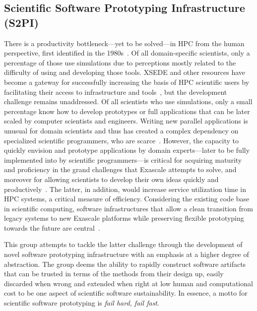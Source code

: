 \subsection{Scientific Software Prototyping Infrastructure (S2PI)}
\label{sec:prototyping}

There is a productivity bottleneck---yet to be solved---in HPC from the human
perspective, first identified in the 1980s~\cite{barstow1982automatic}. Of all
domain-specific scientists, only a percentage of those use simulations due to
perceptions mostly related to the difficulty of using and developing those tools.
XSEDE and other resources have become a gateway for successfully increasing the
basis of HPC scientific users by facilitating their access to infrastructure and
tools~\cite{towns2014xsede}, but the development challenge remains unaddressed.
Of all scientists who use simulations, only a small percentage know how
to develop prototypes or full applications that can be later scaled by computer
scientists and engineers. Writing new parallel applications is unusual for
domain scientists and thus has created a complex dependency on specialized
scientific programmers, who are scarce~\cite{post2005computational}. However,
the capacity to quickly envision and prototype applications by domain
experts---later to be fully implemented into by scientific programmers---is critical for
acquiring maturity and proficiency in the grand challenges that Exascale
attempts to solve, and moreover for allowing scientists to develop their own
ideas quickly and productively~\cite{vinter2015prototyping}. The latter, in
addition, would increase service utilization time in HPC systems, a critical
measure of efficiency. Considering the existing code base in scientific
computing, software infrastructures that allow a clean transition from legacy
systems to new Exascale platforms while preserving flexible prototyping
towards the future are central~\cite{hwu2015transitioning}.

This group attempts to tackle the latter challenge through the development of
novel software prototyping infrastructure with an emphasis at a higher degree
of abstraction. The group deems the ability to rapidly construct software artifacts that can be
trusted in terms of the methods from their design up, easily discarded when
wrong and extended when right at low human and computational cost to be one
aspect of scientific software sustainability. In essence,
a motto for scientific software prototyping is \textit{fail hard, fail fast}.


